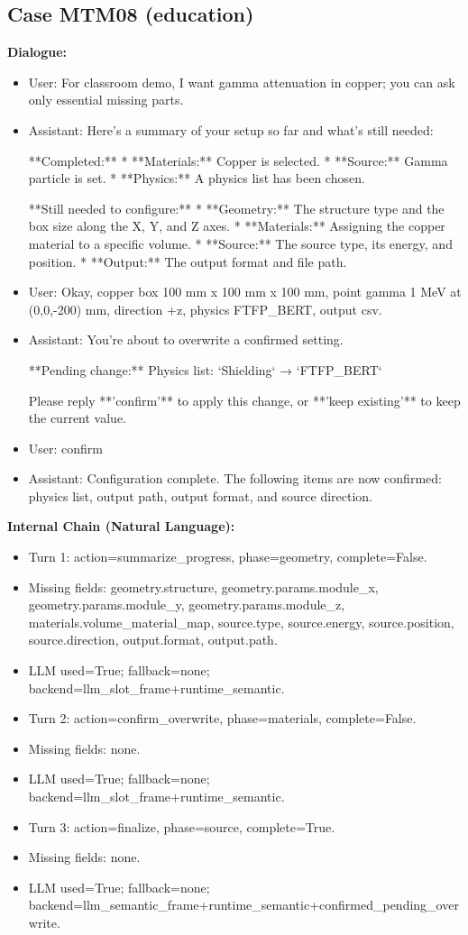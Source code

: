 \documentclass[11pt]{ctexart}
\begin{document}
\subsection{Case MTM08 (education)}
\textbf{Dialogue:}
\begin{itemize}
\item User: For classroom demo, I want gamma attenuation in copper; you can ask only essential missing parts.
\item Assistant: Here's a summary of your setup so far and what's still needed:

**Completed:**
*   **Materials:** Copper is selected.
*   **Source:** Gamma particle is set.
*   **Physics:** A physics list has been chosen.

**Still needed to configure:**
*   **Geometry:** The structure type and the box size along the X, Y, and Z axes.
*   **Materials:** Assigning the copper material to a specific volume.
*   **Source:** The source type, its energy, and position.
*   **Output:** The output format and file path.
\item User: Okay, copper box 100 mm x 100 mm x 100 mm, point gamma 1 MeV at (0,0,-200) mm, direction +z, physics FTFP\_BERT, output csv.
\item Assistant: You're about to overwrite a confirmed setting.

**Pending change:**  
Physics list: `Shielding` → `FTFP\_BERT`

Please reply **'confirm'** to apply this change, or **'keep existing'** to keep the current value.
\item User: confirm
\item Assistant: Configuration complete. The following items are now confirmed: physics list, output path, output format, and source direction.
\end{itemize}
\textbf{Internal Chain (Natural Language):}
\begin{itemize}
\item Turn 1: action=summarize\_progress, phase=geometry, complete=False.
\item Missing fields: geometry.structure, geometry.params.module\_x, geometry.params.module\_y, geometry.params.module\_z, materials.volume\_material\_map, source.type, source.energy, source.position, source.direction, output.format, output.path.
\item LLM used=True; fallback=none; backend=llm\_slot\_frame+runtime\_semantic.
\item Turn 2: action=confirm\_overwrite, phase=materials, complete=False.
\item Missing fields: none.
\item LLM used=True; fallback=none; backend=llm\_slot\_frame+runtime\_semantic.
\item Turn 3: action=finalize, phase=source, complete=True.
\item Missing fields: none.
\item LLM used=True; fallback=none; backend=llm\_semantic\_frame+runtime\_semantic+confirmed\_pending\_overwrite.
\end{itemize}
\end{document}

